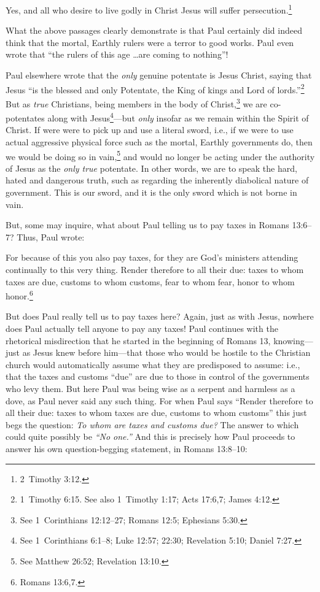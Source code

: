 \documentclass[letterpaper,12pt]{article}
\newenvironment{squote}
  {\small\quote}
  {\endquote\normalsize}
\begin{document}
\begin{squote}
Yes, and all who desire to live godly in Christ Jesus will suffer persecution.\footnote{2~Timothy 3:12.}
\end{squote}

What the above passages clearly demonstrate is that Paul certainly did indeed think that the mortal, Earthly rulers were a terror to good works. Paul even wrote that ``the rulers of this age \ldots are coming to nothing''!

Paul elsewhere wrote that the \emph{only} genuine potentate is Jesus Christ, saying that Jesus ``is the blessed and only Potentate, the King of kings and Lord of lords.''\footnote{1~Timothy 6:15. See also 1~Timothy 1:17; Acts 17:6,7; James 4:12.} But as \emph{true} Christians, being members in the body of Christ,\footnote{See 1~Corinthians 12:12--27; Romans 12:5; Ephesians 5:30.} we are co-potentates along with Jesus\footnote{See 1~Corinthians 6:1--8; Luke 12:57; 22:30; Revelation 5:10; Daniel 7:27.}---but \emph{only} insofar as we remain within the Spirit of Christ. If were were to pick up and use a literal sword, i.e., if we were to use actual aggressive physical force such as the mortal, Earthly governments do, then we would be doing so in vain,\footnote{See Matthew 26:52; Revelation 13:10.} and would no longer be acting under the authority of Jesus as the \emph{only true} potentate. In other words, we are to speak the hard, hated and dangerous truth, such as regarding the inherently diabolical nature of government. This is our sword, and it is the only sword which is not borne in vain.

But, some may inquire, what about Paul telling us to pay taxes in Romans 13:6--7? Thus, Paul wrote:

\begin{squote}
For because of this you also pay taxes, for they are God's ministers attending continually to this very thing. Render therefore to all their due: taxes to whom taxes are due, customs to whom customs, fear to whom fear, honor to whom honor.\footnote{Romans 13:6,7.}
\end{squote}

But does Paul really tell us to pay taxes here? Again, just as with Jesus, nowhere does Paul actually tell anyone to pay any taxes! Paul continues with the rhetorical misdirection that he started in the beginning of Romans 13, knowing---just as Jesus knew before him---that those who would be hostile to the Christian church would automatically assume what they are predisposed to assume: i.e., that the taxes and customs ``due'' are due to those in control of the governments who levy them. But here Paul was being wise as a serpent and harmless as a dove, as Paul never said any such thing. For when Paul says ``Render therefore to all their due: taxes to whom taxes are due, customs to whom customs'' this just begs the question: \emph{To whom are taxes and customs due?} The answer to which could quite possibly be \emph{``No one.''} And this is precisely how Paul proceeds to answer his own question-begging statement, in Romans 13:8--10:
\end{document}
